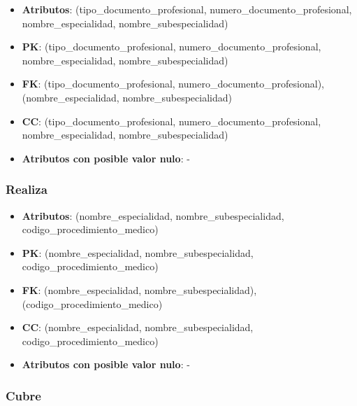 \documentclass[a4paper,11pt]{article}
\begin{document}
\begin{itemize}

\item 
\textbf{Atributos}: (tipo\_documento\_profesional, numero\_documento\_profesional, nombre\_especialidad,
nombre\_subespecialidad)

\item 
\textbf{PK}: (tipo\_documento\_profesional, numero\_documento\_profesional, nombre\_especialidad,
nombre\_subespecialidad)

\item
\textbf{FK}: (tipo\_documento\_profesional, numero\_documento\_profesional), (nombre\_especialidad,
nombre\_subespecialidad)

\item 
\textbf{CC}: (tipo\_documento\_profesional, numero\_documento\_profesional, nombre\_especialidad,
nombre\_subespecialidad)

\item 
\textbf{Atributos con posible valor nulo}: -

\end{itemize}
\subsubsection{\textbf{Realiza}}

\begin{itemize}

\item 
\textbf{Atributos}: (nombre\_especialidad, nombre\_subespecialidad, codigo\_procedimiento\_medico)

\item 
\textbf{PK}: (nombre\_especialidad, nombre\_subespecialidad, codigo\_procedimiento\_medico)

\item
\textbf{FK}: (nombre\_especialidad, nombre\_subespecialidad), (codigo\_procedimiento\_medico)

\item 
\textbf{CC}: (nombre\_especialidad, nombre\_subespecialidad, codigo\_procedimiento\_medico)

\item 
\textbf{Atributos con posible valor nulo}: -

\end{itemize}
\subsubsection{\textbf{Cubre}}
\end{document}
